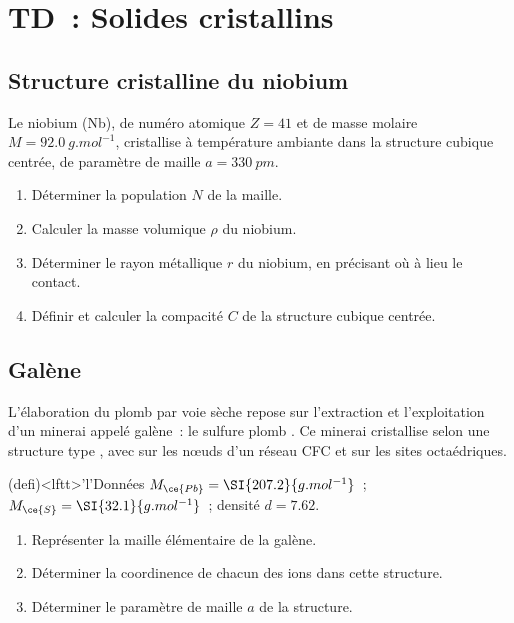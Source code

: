 \documentclass[a4paper, 10pt, final, garamond]{book}
\begin{document}
\setcounter{chapter}{2}

\chapter{TD~: Solides cristallins}

\section{Structure cristalline du niobium}
Le niobium (Nb), de numéro atomique $Z = 41$ et de masse molaire $M =
	\SI{92.0}{g.mol^{-1}}$, cristallise à température ambiante dans la structure
cubique centrée, de paramètre de maille $a = \SI{330}{pm}$.
\begin{enumerate}
	\item Déterminer la population $N$ de la maille.
	\item Calculer la masse volumique $\rho$ du niobium.
	\item Déterminer le rayon métallique $r$ du niobium, en précisant où à lieu le
	      contact.
	\item Définir et calculer la compacité $C$ de la structure cubique centrée.
\end{enumerate}

\section{Galène}
L'élaboration du plomb par voie sèche repose sur l'extraction et l'exploitation
d'un minerai appelé galène~: le sulfure plomb . Ce minerai cristallise
selon une structure type , avec  sur les nœuds d'un réseau
CFC et  sur les sites octaédriques.
\begin{tcn}(defi)<lftt>'l'{Données}
	$M_{\ce{Pb}} = \SI{207.2}{g.mol^{-1}}$~; $M_{\ce{S}} =
		\SI{32.1}{g.mol^{-1}}$~; densité $d = \num{7.62}$.
\end{tcn}
\begin{enumerate}
	\item Représenter la maille élémentaire de la galène.
	\item Déterminer la coordinence de chacun des ions dans cette structure.
	\item Déterminer le paramètre de maille $a$ de la structure.
\end{enumerate}
\end{document}
